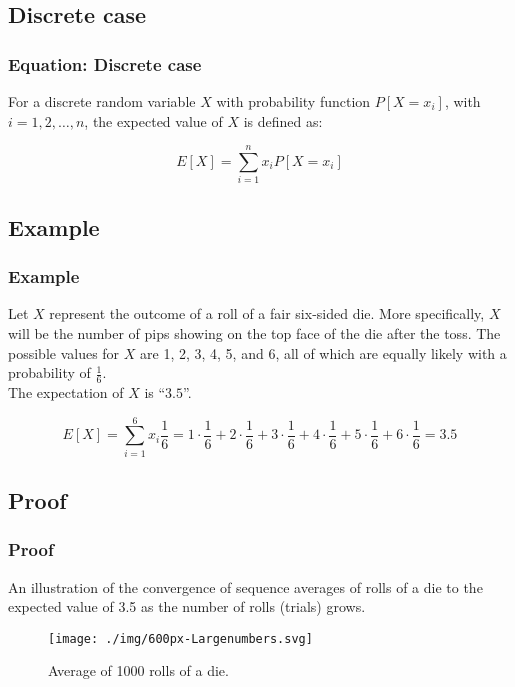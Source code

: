 \subsection{Discrete case}\label{subsec:equation}
\begin{frame}
    \frametitle{Equation: Discrete case}
    For a discrete random variable $X$ with probability function $P[X=x_i]$, with $i=1,2,\dots,n$, the expected value of $X$ is defined as:
    \begin{block}{}
        \begin{equation}
            E[X] = \sum_{i=1}^{n} x_i P[X=x_i]\label{eq:equation1}
        \end{equation}
    \end{block}
\end{frame}

\subsection{Example}\label{subsec:example}
\begin{frame}
    \frametitle{Example}
    \begin{block}{}
        Let $X$ represent the outcome of a roll of a fair six-sided die.
        More specifically, $X$ will be the number of pips showing on the top face of the die after the toss.
        The possible values for $X$ are 1, 2, 3, 4, 5, and 6, all of which are equally likely with a probability of $\frac{1}{6}$.\\
        The expectation of $X$ is ``$3.5$''.
    \end{block}
    \begin{equation}
        E[X] = \sum_{i=1}^{6} x_i \frac{1}{6} = 1 \cdot \frac{1}{6} + 2 \cdot \frac{1}{6} + 3 \cdot \frac{1}{6} + 4 \cdot \frac{1}{6} + 5 \cdot \frac{1}{6} + 6 \cdot \frac{1}{6} = 3.5\label{eq:equation2}
    \end{equation}
\end{frame}

\subsection{Proof}\label{subsec:proof}
\begin{frame}
    \frametitle{Proof}
    An illustration of the convergence of sequence averages of rolls of a die to the expected value of 3.5 as the number of rolls (trials) grows.
    \begin{figure}[h]
        \centering
        \texttt{[image: ./img/600px-Largenumbers.svg]}
        \caption{Average of 1000 rolls of a die.}
        \label{fig:example1}
    \end{figure}
\end{frame}

